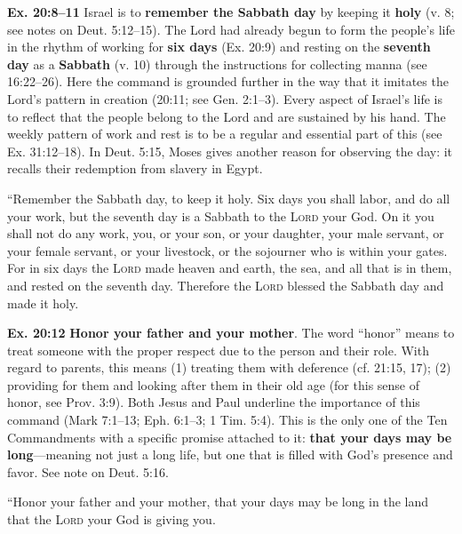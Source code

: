 \documentclass{bible-study-handout}
\begin{document}
\begin{studycommentinline}\textbf{Ex. 20:8–11} Israel is to \textbf{remember the Sabbath day} by keeping it \textbf{holy} (v. 8; see notes on Deut. 5:12–15). The Lord had already begun to form the people’s life in the rhythm of working for \textbf{six days} (Ex. 20:9) and resting on the \textbf{seventh day} as a \textbf{Sabbath} (v. 10) through the instructions for collecting manna (see 16:22–26). Here the command is grounded further in the way that it imitates the Lord’s pattern in creation (20:11; see Gen. 2:1–3). Every aspect of Israel’s life is to reflect that the people belong to the Lord and are sustained by his hand. The weekly pattern of work and rest is to be a regular and essential part of this (see Ex. 31:12–18). In Deut. 5:15, Moses gives another reason for observing the day: it recalls their redemption from slavery in Egypt.\end{studycommentinline}

“Remember the Sabbath day, to keep it holy. Six days you shall labor, and do all your work, but the seventh day is a Sabbath to the \textsc{Lord} your God. On it you shall not do any work, you, or your son, or your daughter, your male servant, or your female servant, or your livestock, or the sojourner who is within your gates. For in six days the \textsc{Lord} made heaven and earth, the sea, and all that is in them, and rested on the seventh day. Therefore the \textsc{Lord} blessed the Sabbath day and made it holy.

\begin{studycomment}\textbf{Ex. 20:12} \textbf{Honor your father and your mother}. The word “honor” means to treat someone with the proper respect due to the person and their role. With regard to parents, this means (1) treating them with deference (cf. 21:15, 17); (2) providing for them and looking after them in their old age (for this sense of honor, see Prov. 3:9). Both Jesus and Paul underline the importance of this command (Mark 7:1–13; Eph. 6:1–3; 1 Tim. 5:4). This is the only one of the Ten Commandments with a specific promise attached to it: \textbf{that your days may be long}—meaning not just a long life, but one that is filled with God’s presence and favor. See note on Deut. 5:16.\end{studycomment}“Honor your father and your mother, that your days may be long in the land that the \textsc{Lord} your God is giving you.
\end{document}
